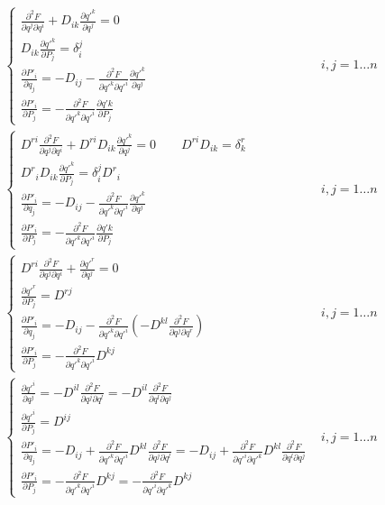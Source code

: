 \begin{align*}
& \begin{cases}
\frac{\partial^2 F}{\partial q^j \partial q^i} + D_{ik} \frac{\partial q'^k}{\partial q^j} = 0
\\
D_{ik} \frac{\partial q'^k}{\partial P_j} = \delta_i^j
\\
\frac{\partial P'_i}{\partial q_j} = - D_{ij} - \frac{\partial^2 F}{\partial q'^k \partial q'^i} \frac{\partial q'^k}{\partial q^j}
\\
\frac{\partial P'_i}{\partial P_j} = - \frac{\partial^2 F}{\partial q'^k \partial q'^i} \frac{\partial q'k}{\partial P_j}
\end{cases} & i, j = 1 \dots n
\\
& \begin{cases}
D^{ri} \frac{\partial^2 F}{\partial q^j \partial q^i} + D^{ri} D_{ik} \frac{\partial q'^k}{\partial q^j} = 0 \qquad D^{ri} D_{ik} = \delta_k^r
\\
{D^r}_i D_{ik} \frac{\partial q'^k}{\partial P_j} = \delta_i^j {D^r}_i
\\
\frac{\partial P'_i}{\partial q_j} = - D_{ij} - \frac{\partial^2 F}{\partial q'^k \partial q'^i} \frac{\partial q'^k}{\partial q^j}
\\
\frac{\partial P'_i}{\partial P_j} = - \frac{\partial^2 F}{\partial q'^k \partial q'^i} \frac{\partial q'k}{\partial P_j}
\end{cases} & i, j = 1 \dots n
\\
& \begin{cases}
D^{ri} \frac{\partial^2 F}{\partial q^j \partial q^i} + \frac{\partial q'^r}{\partial q^j} = 0
\\
\frac{\partial q'^r}{\partial P_j} = D^{rj}
\\
\frac{\partial P'_i}{\partial q_j} = - D_{ij} - \frac{\partial^2 F}{\partial q'^k \partial q'^i} \left( -D^{kl} \frac{\partial ^2 F}{\partial q^j \partial q^r} \right)
\\
\frac{\partial P'_i}{\partial P_j} = - \frac{\partial^2 F}{\partial q'^k \partial q'^i} D^{kj}
\end{cases} & i, j = 1 \dots n
\\
& \begin{cases}
\frac{\partial q'^i}{\partial q^j} = - D^{il} \frac{\partial^2 F}{\partial q^j \partial q^l} =- D^{il} \frac{\partial^2 F}{\partial q^l \partial q^j}
\\
\frac{\partial q'^i}{\partial P_j} = D^{ij}
\\
\frac{\partial P'_i}{\partial q_j} = - D_{ij} + \frac{\partial^2 F}{\partial q'^k \partial q'^i}  D^{kl} \frac{\partial ^2 F}{\partial q^j \partial q^l} = - D_{ij} + \frac{\partial^2 F}{\partial q'^i \partial q'^k}  D^{kl} \frac{\partial ^2 F}{\partial q^l \partial q^j}
\\
\frac{\partial P'_i}{\partial P_j} = - \frac{\partial^2 F}{\partial q'^k \partial q'^i} D^{kj} = - \frac{\partial^2 F}{\partial q'^i \partial q'^k} D^{kj}
\end{cases} & i, j = 1 \dots n
\end{align*}

